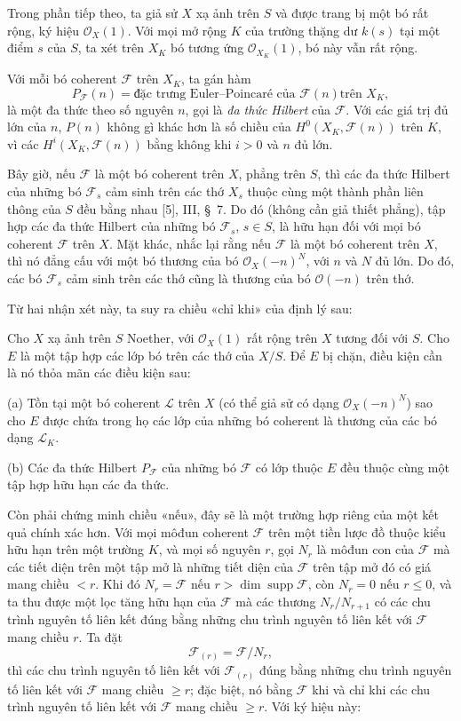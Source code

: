 
Trong phần tiếp theo, ta giả sử $X$ xạ ảnh trên $S$ và được trang bị một bó rất
rộng, ký hiệu $\mathcal O_X(1)$. Với mọi mở rộng $K$ của trường thặng dư $k(s)$
tại một điểm $s$ của $S$, ta xét trên $X_K$ bó tương ứng
$\mathcal O_{X_K}(1)$, bó này vẫn rất rộng.

Với mỗi bó coherent $\mathcal F$ trên $X_K$, ta gán hàm
\[
P_{\mathcal F}(n)=\text{đặc trưng Euler--Poincaré của $\mathcal F(n)$
trên $X_K$},
\]
là một đa thức theo số nguyên $n$, gọi là \emph{đa thức Hilbert} của
$\mathcal F$. Với các giá trị đủ lớn của $n$, $P(n)$ không gì khác hơn là số
chiều của $H^0(X_K,\mathcal F(n))$ trên $K$, vì các
$H^i(X_K,\mathcal F(n))$ bằng không khi $i>0$ và $n$ đủ lớn.

Bây giờ, nếu $\mathcal F$ là một bó coherent trên $X$, phẳng trên $S$, thì các
đa thức Hilbert của những bó $\mathcal F_s$ cảm sinh trên các thớ $X_s$ thuộc
cùng một thành phần liên thông của $S$ đều bằng nhau [5], III, \S~7. Do đó
(không cần giả thiết phẳng), tập hợp các đa thức Hilbert của những bó
$\mathcal F_s$, $s\in S$, là hữu hạn đối với mọi bó coherent $\mathcal F$ trên
$X$.
Mặt khác, nhắc lại rằng nếu $\mathcal F$ là một bó coherent trên $X$, thì nó
đẳng cấu với một bó thương của bó $\mathcal O_X(-n)^N$, với $n$ và $N$ đủ
lớn. Do đó, các bó $\mathcal F_s$ cảm sinh trên các thớ cũng là thương của bó
$\mathcal O(-n)$ trên thớ.

Từ hai nhận xét này, ta suy ra chiều «chỉ khi» của định lý sau:

 Cho $X$ xạ ảnh trên $S$ Noether, với
$\mathcal O_X(1)$ rất rộng trên $X$ tương đối với $S$. Cho $E$ là một tập hợp
các lớp bó trên các thớ của $X/S$. Để $E$ bị chặn, điều kiện cần là nó thỏa mãn các điều kiện sau:

\medskip
\noindent (a) Tồn tại một bó coherent $\mathcal L$ trên $X$ (có thể giả sử có
dạng $\mathcal O_X(-n)^N$) sao cho $E$ được chứa trong họ các lớp của những bó
coherent là thương của các bó dạng $\mathcal L_K$.

\smallskip
\noindent (b) Các đa thức Hilbert $P_{\mathcal F}$ của những bó $\mathcal F$
có lớp thuộc $E$ đều thuộc cùng một tập hợp hữu hạn các đa thức.

Còn phải chứng minh chiều «nếu», đây sẽ là một trường hợp riêng của một kết quả
chính xác hơn. Với mọi môđun coherent $\mathcal F$ trên một tiền lược đồ thuộc
kiểu hữu hạn trên một trường $K$, và mọi số nguyên $r$, gọi $N_r$ là môđun con
của $\mathcal F$ mà các tiết diện trên một tập mở là những tiết diện của
$\mathcal F$ trên tập mở đó có giá mang chiều $<r$. Khi đó
$N_r=\mathcal F$ nếu $r>\dim\operatorname{supp}\mathcal F$, còn $N_r=0$ nếu
$r\leq0$, và ta thu được một lọc tăng hữu hạn của $\mathcal F$ mà các thương
$N_r/N_{r+1}$ có các chu trình nguyên tố
liên kết đúng bằng những chu trình nguyên tố liên kết với $\mathcal F$ mang
chiều $r$. Ta đặt
\[
\mathcal F_{(r)}=\mathcal F/N_r,
\]
thì các chu trình nguyên tố liên kết với $\mathcal F_{(r)}$ đúng bằng những chu
trình nguyên tố liên kết với $\mathcal F$ mang chiều $\geq r$; đặc biệt, nó
bằng $\mathcal F$ khi và chỉ khi các chu trình nguyên tố liên kết với
$\mathcal F$ mang chiều $\geq r$. Với ký hiệu này:

